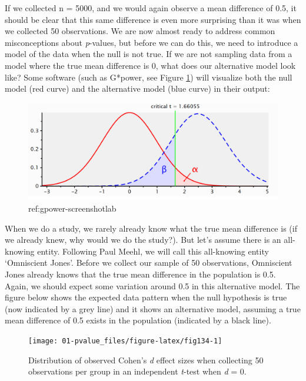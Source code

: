\documentclass[
  oneside]{book}
\begin{document}
If we collected n = 5000, and we would again observe a mean difference of 0.5, it should be clear that this same difference is even more surprising than it was when we collected 50 observations. We are now almost ready to address common misconceptions about \emph{p}-values, but before we can do this, we need to introduce a model of the data when the null is not true. If we are not sampling data from a model where the true mean difference is 0, what does our alternative model look like? Some software (such as G*power, see Figure \ref{fig:gpower-screenshot}) will visualize both the null model (red curve) and the alternative model (blue curve) in their output:



\begin{figure}

{\centering \includegraphics[width=1\linewidth]{images/1.3.3} 

}

\caption{ref:gpower-screenshotlab}\label{fig:gpower-screenshot}
\end{figure}

When we do a study, we rarely already know what the true mean difference is (if we already knew, why would we do the study?). But let's assume there is an all-knowing entity. Following Paul Meehl, we will call this all-knowing entity `Omniscient Jones'. Before we collect our sample of 50 observations, Omniscient Jones already knows that the true mean difference in the population is 0.5. Again, we should expect some variation around 0.5 in this alternative model. The figure below shows the expected data pattern when the null hypothesis is true (now indicated by a grey line) and it shows an alternative model, assuming a true mean difference of 0.5 exists in the population (indicated by a black line).



\begin{figure}

{\centering \texttt{[image: 01-pvalue\_files/figure-latex/fig134-1]} 

}

\caption{Distribution of observed Cohen's \emph{d} effect sizes when collecting 50 observations per group in an independent \emph{t}-test when \emph{d} = 0.}\label{fig:fig134}
\end{figure}
\end{document}
